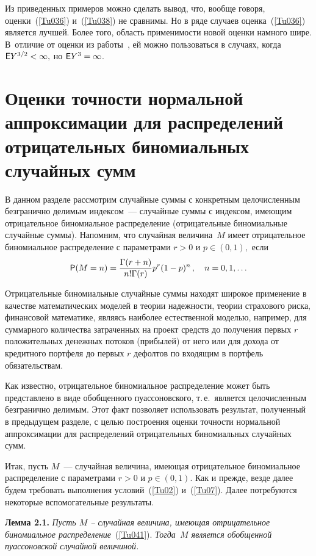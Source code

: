 \begin{multicols}{2}
Из приведенных примеров можно сделать вывод, что, вообще говоря,
оценки~(\ref{Tu036}) и~(\ref{Tu038}) не сравнимы. Но в ряде
случаев оценка~(\ref{Tu036}) является лучшей. Более того, область
применимости новой оценки намного шире. В~отличие от оценки из
работы~\cite{5g}, ей можно пользоваться в случаях, когда ${\sf E}
Y^{3/2} < \infty,$ но ${\sf E} Y^3 = \infty$.

\section{Оценки точности нормальной аппроксимации для распределений отрицательных биномиальных
случайных сумм}

В данном разделе рассмотрим случайные суммы с конкретным
целочисленным безгранично делимым индексом~--- случайные суммы с
индексом, имеющим отрицательное биномиальное распределение
(отрицательные биномиальные случайные суммы). Напомним, что
случайная величина~$M$ имеет отрицательное биномиальное
распределение с параметрами $r>0$ и $p \in (0,1),$ если
\begin{equation}
 {\sf P}(M=n) =
\displaystyle\frac{\displaystyle \Gamma(r+n)\mathstrut}{\displaystyle n!\Gamma(r)\mathstrut}p^r(1-p)^n\,,\quad  n=0,1,\ldots
\label{Tu041}
\end{equation}

Отрицательные биномиальные случайные суммы находят широкое
применение в качестве математических моделей в теории надежности,
тео\-рии страхового риска, финансовой математике, являясь наиболее
естественной моделью, например, для суммарного количества
затраченных на проект средств до получения первых $r$
положительных денежных потоков (прибылей) от него или для дохода
от кредитного портфеля до первых $r$ дефолтов по входящим в
портфель обязательствам.

Как известно, отрицательное биномиальное распределение может быть
представлено в виде обобщенного пуассоновского, т.\,е.\ является
целочисленным безгранично делимым. Этот факт позволяет
 использовать результат, полученный в предыдущем разделе, с целью
построения оценки точности нормальной аппроксимации для
распределений отрицательных биномиальных случайных сумм.

Итак, пусть $M$~--- случайная величина, имеющая отрицательное
биномиальное распределение с параметрами $r>0$ и $p \in (0,1)$.
Как и прежде, везде далее будем требовать выполнения условий~(\ref{Tu02}) 
и~(\ref{Tu07}). Далее потребуются некоторые вспомогательные результаты.

\medskip

\noindent
\textbf{Лемма 2.1.} \textit{Пусть $M$ -- случайная величина, имеющая отрицательное
биномиальное распределение}~(\ref{Tu041}). \textit{Тогда~$M$ является
обобщенной пуассоновской случайной величиной.}
\medskip


\end{multicols}
